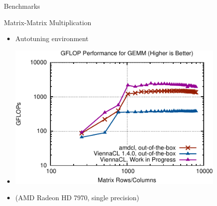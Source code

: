 


\begin{frame}{Benchmarks}

 \begin{block}{Matrix-Matrix Multiplication}
  \begin{itemize}
   \item Autotuning environment 
   \item \includegraphics[width=0.85\textwidth]{figures/gemm3.pdf}
   \item \centering (AMD Radeon HD 7970, single precision)
  \end{itemize}

 \end{block}

\end{frame}


